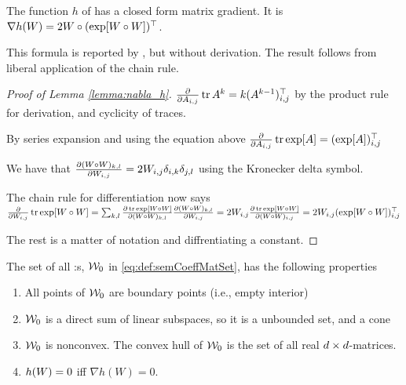 \begin{lemma}
\label{lemma:nabla_h}
	The function $h$ of \citet{zheng_dags_2018} has a closed form matrix gradient. It is ${\nabla h(W) = 2W \circ (\exp [ W\circ W ])^\top}$.
\end{lemma}
This formula is reported by \citet{zheng_dags_2018}, but without derivation. The result follows from liberal application of the chain rule.
\begin{proof}[Proof of Lemma \ref{lemma:nabla_h}]
$\frac{\partial}{\partial A_{i,j}} \operatorname*{tr} A^k = k(A^{k-1})^\top_{i,j}$ by the product rule for derivation, and cyclicity of traces.

By series expansion and using the equation above
$\frac{\partial}{\partial A_{i,j}} \operatorname*{tr} \exp [ A ] = (\exp[A])^\top_{i,j}$

We have that  $\frac{\partial (W \circ W)_{k,l}}{\partial W_{i,j} } = 2W_{i,j} \delta_{i,k} \delta_{j,l}$ using the Kronecker delta symbol.

The chain rule for differentiation now says
$\frac{\partial}{\partial W_{i,j}} \operatorname*{tr} \exp [ W \circ W] 
= \sum_{k,l} \frac{\partial \operatorname*{tr} \exp [ W \circ W]}{\partial (W\circ W)_{k,l}} \frac{\partial (W \circ W)_{k,l}}{\partial W_{i,j} }
= 2W_{i,j}\frac{\partial \operatorname*{tr} \exp [ W \circ W]}{\partial (W\circ W)_{i,j}} 
= 2W_{i,j}(\exp[W \circ W])^\top_{i,j}$

The rest is a matter of notation and diffrentiating a constant.
\end{proof}




\begin{lemma} \label{lemma:nonconvexWset}
The set of all \DAG{}:s, $\mathcal W_0$ in \eqref{eq:def:semCoeffMatSet}, has the following properties
\begin{enumerate}
    \item  All points of $\mathcal W_0$ are boundary points (i.e., empty interior)
    \item $\mathcal W_0$ is a direct sum of linear subspaces, so it is a unbounded set, and a cone
    \item $\mathcal W_0$ is nonconvex. The convex hull of $\mathcal W_0$ is the set of all real $d\times d$-matrices.
    \item $h(W)=0$ iff $\nabla h(W) =0$.
\end{enumerate}
\end{lemma}

